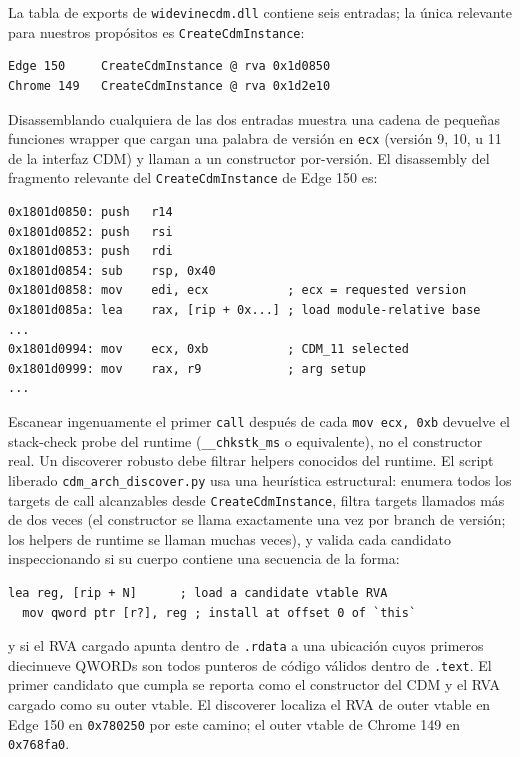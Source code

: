 \documentclass[11pt,letterpaper]{article}
\begin{document}
La tabla de exports de \texttt{widevinecdm.dll} contiene seis
entradas; la única relevante para nuestros propósitos es
\texttt{CreateCdmInstance}:

\begin{lstlisting}[basicstyle=\ttfamily\scriptsize]
Edge 150     CreateCdmInstance @ rva 0x1d0850
Chrome 149   CreateCdmInstance @ rva 0x1d2e10
\end{lstlisting}

Disassemblando cualquiera de las dos entradas muestra una cadena
de pequeñas funciones wrapper que cargan una palabra de versión
en \texttt{ecx} (versión 9, 10, u 11 de la interfaz CDM) y llaman
a un constructor por-versión. El disassembly del fragmento
relevante del \texttt{CreateCdmInstance} de Edge 150 es:

\begin{lstlisting}[basicstyle=\ttfamily\scriptsize]
0x1801d0850: push   r14
0x1801d0852: push   rsi
0x1801d0853: push   rdi
0x1801d0854: sub    rsp, 0x40
0x1801d0858: mov    edi, ecx           ; ecx = requested version
0x1801d085a: lea    rax, [rip + 0x...] ; load module-relative base
...
0x1801d0994: mov    ecx, 0xb           ; CDM_11 selected
0x1801d0999: mov    rax, r9            ; arg setup
...
\end{lstlisting}

Escanear ingenuamente el primer \texttt{call} después de cada
\texttt{mov ecx, 0xb} devuelve el stack-check probe del runtime
(\texttt{\_\_chkstk\_ms} o equivalente), no el constructor real.
Un discoverer robusto debe filtrar helpers conocidos del runtime.
El script liberado \texttt{cdm\_arch\_discover.py} usa una
heurística estructural: enumera todos los targets de call
alcanzables desde \texttt{CreateCdmInstance}, filtra targets
llamados más de dos veces (el constructor se llama exactamente
una vez por branch de versión; los helpers de runtime se llaman
muchas veces), y valida cada candidato inspeccionando si su
cuerpo contiene una secuencia de la forma:

\begin{lstlisting}[basicstyle=\ttfamily\scriptsize]
  lea reg, [rip + N]      ; load a candidate vtable RVA
  mov qword ptr [r?], reg ; install at offset 0 of `this`
\end{lstlisting}

\noindent y si el RVA cargado apunta dentro de \texttt{.rdata} a
una ubicación cuyos primeros diecinueve QWORDs son todos punteros
de código válidos dentro de \texttt{.text}. El primer candidato
que cumpla se reporta como el constructor del CDM y el RVA
cargado como su outer vtable. El discoverer localiza el RVA de
outer vtable en Edge 150 en \texttt{0x780250} por este camino; el
outer vtable de Chrome 149 en \texttt{0x768fa0}.
\end{document}
